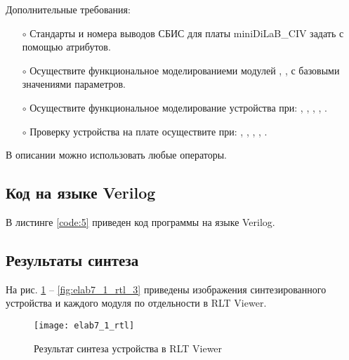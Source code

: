 Дополнительные требования:
\begin{itemize}
	\item[$\circ$] Стандарты и номера выводов СБИС для платы miniDiLaB\_CIV задать с помощью атрибутов.
	\item[$\circ$] Осуществите функциональное моделированиеми  модулей , ,  с базовыми значениями параметров.
	\item[$\circ$] Осуществите функциональное моделирование устройства при: , , , , .
	\item[$\circ$] Проверку устройства на плате осуществите при: , , , , .
\end{itemize}
В описании можно использовать любые операторы.

\newpage

\subsection{Код на языке Verilog}

В листинге \ref{code:5} приведен код программы на языке Verilog.



\newpage





\newpage



\newpage

\subsection{Результаты синтеза}

На рис. \ref{fig:elab7_1_rtl} -- \ref{fig:elab7_1_rtl_3} приведены изображения синтезированного устройства и каждого модуля по отдельности в RLT Viewer.

\begin{figure}[H]
\begin{center}
	\texttt{[image: elab7\_1\_rtl]}
	\caption{Результат синтеза устройства в RLT Viewer}
	\label{fig:elab7_1_rtl}
\end{center}
\end{figure}

